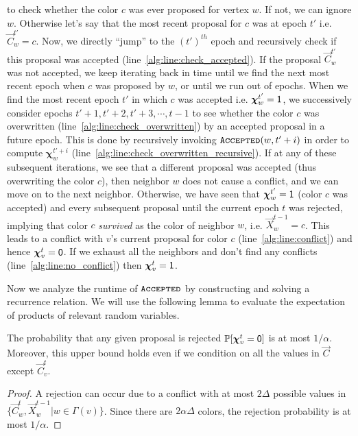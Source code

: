 to check whether the color $c$ was ever proposed for vertex $w$.
If not, we can ignore $w$.
Otherwise let's say that the most recent proposal for $c$ was at epoch $t'$ i.e. $\vec C^{t'}_w = c$.
Now, we directly ``jump'' to the $(t')^{th}$ epoch and recursively check if this proposal was accepted (line~\ref{alg:line:check_accepted}).
If the proposal $\vec C^{t'}_w$ was not accepted, we keep iterating back in time until we find the next most recent epoch
when $c$ was proposed by $w$, or until we run out of epochs.
When we find the most recent epoch $t'$ in which $c$ was accepted i.e. $\bm\chi^{t'}_w = \mathsf{1}$,
we successively consider epochs $t'+1, t'+2, t'+3, \cdots, t-1$ to see whether the color $c$ was overwritten
(line~\ref{alg:line:check_overwritten}) by an accepted proposal in a future epoch.
This is done by recursively invoking $\texttt{\textsc{Accepted}}(w,t'+i)$ in order to compute $\bm\chi^{t'+i}_w$ (line~\ref{alg:line:check_overwritten_recursive}).
If at any of these subsequent iterations, we see that a different proposal was accepted (thus overwriting the color $c$),
then neighbor $w$ does not cause a conflict, and we can move on to the next neighbor.
Otherwise, we have seen that $\bm\chi^{t'}_w = \mathsf{1}$ (color $c$ was accepted) and every subsequent proposal until the current epoch $t$ was rejected,
implying that color $c$ \emph{survived} as the color of neighbor $w$, i.e. $\vec X^{t-1}_w = c$.
This leads to a conflict with $v$'s current proposal for color $c$ (line~\ref{alg:line:conflict}) and hence $\bm\chi^t_v = \mathsf{0}$.
If we exhaust all the neighbors and don't find any conflicts (line~\ref{alg:line:no_conflict}) then $\bm\chi^t_v = \mathsf{1}$.

Now we analyze the runtime of $\texttt{\textsc{Accepted}}$ by constructing and solving a recurrence relation.
We will use the following lemma to evaluate the expectation of products of relevant random variables.

\begin{lemma}
\label{lem:color_reject_probability}
The probability that any given proposal is rejected $\mathbb P[\bm\chi^t_v=\mathsf{0}]$ is at most $1/\alpha$.
Moreover, this upper bound holds even if we condition on all the values in $\vec C$ except $\vec C^t_v$.
\end{lemma}
\begin{proof}
A rejection can occur due to a conflict with at most $2\Delta$ possible values in $\{\vec C^t_w, \vec X^{t-1}_w | w\in\Gamma(v)\}$.
Since there are $2\alpha\Delta$ colors, the rejection probability is at most $1/\alpha$.
\end{proof}

